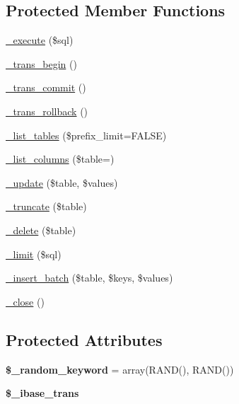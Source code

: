 \subsection*{Protected Member Functions}
\begin{DoxyCompactItemize}
\item 
\mbox{\hyperlink{class_c_i___d_b__ibase__driver_ab5e371100011e1960655013db3ad4eca}{\+\_\+execute}} (\$sql)
\item 
\mbox{\hyperlink{class_c_i___d_b__ibase__driver_a1a6178127f5a21f85e71098264090b5a}{\+\_\+trans\+\_\+begin}} ()
\item 
\mbox{\hyperlink{class_c_i___d_b__ibase__driver_aebfe937e89e367a26ba645c3cc32a65f}{\+\_\+trans\+\_\+commit}} ()
\item 
\mbox{\hyperlink{class_c_i___d_b__ibase__driver_a2df694f0f0d284ac37fd53c0587ddfdf}{\+\_\+trans\+\_\+rollback}} ()
\item 
\mbox{\hyperlink{class_c_i___d_b__ibase__driver_abe5944de9cc2ea53c4fbd25d32f9f4f9}{\+\_\+list\+\_\+tables}} (\$prefix\+\_\+limit=F\+A\+L\+SE)
\item 
\mbox{\hyperlink{class_c_i___d_b__ibase__driver_a691ad3e25c89cb26a96ab3b4c43fb154}{\+\_\+list\+\_\+columns}} (\$table=\textquotesingle{}\textquotesingle{})
\item 
\mbox{\hyperlink{class_c_i___d_b__ibase__driver_a4631e90e1ec213e5a63f16ef515a9fdf}{\+\_\+update}} (\$table, \$values)
\item 
\mbox{\hyperlink{class_c_i___d_b__ibase__driver_a843b8c47497a1893c0aaa9853a75e6a8}{\+\_\+truncate}} (\$table)
\item 
\mbox{\hyperlink{class_c_i___d_b__ibase__driver_ac2d5d29961b121dd33fedce457869f61}{\+\_\+delete}} (\$table)
\item 
\mbox{\hyperlink{class_c_i___d_b__ibase__driver_afd22afcc8fe336f96be8cc84f3d05fd3}{\+\_\+limit}} (\$sql)
\item 
\mbox{\hyperlink{class_c_i___d_b__ibase__driver_a1eeb28762e1e24f4e51cf64bce5cd011}{\+\_\+insert\+\_\+batch}} (\$table, \$keys, \$values)
\item 
\mbox{\hyperlink{class_c_i___d_b__ibase__driver_a816c68b2253ba175dff57dc765c99148}{\+\_\+close}} ()
\end{DoxyCompactItemize}
\subsection*{Protected Attributes}
\begin{DoxyCompactItemize}
\item 
\mbox{\label{class_c_i___d_b__ibase__driver_a2854176b9177cfd767b4c8702b6b444f}} 
{\bfseries \$\+\_\+random\+\_\+keyword} = array(\textquotesingle{}R\+A\+ND()\textquotesingle{}, \textquotesingle{}R\+A\+ND()\textquotesingle{})
\item 
\mbox{\label{class_c_i___d_b__ibase__driver_a22a3aebd754d7da0570788dc14ec356c}} 
{\bfseries \$\+\_\+ibase\+\_\+trans}
\end{DoxyCompactItemize}


